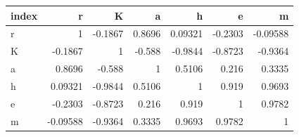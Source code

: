 \begin{tabular}{lrrrrrr}
\toprule
index & r & K & a & h & e & m \\
\midrule
r & 1 & -0.1867 & 0.8696 & 0.09321 & -0.2303 & -0.09588 \\
K & -0.1867 & 1 & -0.588 & -0.9844 & -0.8723 & -0.9364 \\
a & 0.8696 & -0.588 & 1 & 0.5106 & 0.216 & 0.3335 \\
h & 0.09321 & -0.9844 & 0.5106 & 1 & 0.919 & 0.9693 \\
e & -0.2303 & -0.8723 & 0.216 & 0.919 & 1 & 0.9782 \\
m & -0.09588 & -0.9364 & 0.3335 & 0.9693 & 0.9782 & 1 \\
\bottomrule
\end{tabular}
